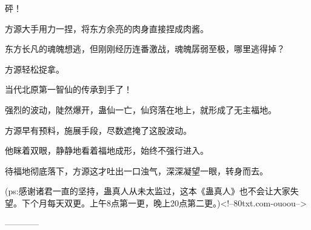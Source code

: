 \begin{this_body}
砰！

方源大手用力一捏，将东方余亮的肉身直接捏成肉酱。

东方长凡的魂魄想逃，但刚刚经历连番激战，魂魄孱弱至极，哪里逃得掉？

方源轻松捉拿。

当代北原第一智仙的传承到手了！

强烈的波动，陡然爆开，蛊仙一亡，仙窍落在地上，就形成了无主福地。

方源早有预料，施展手段，尽数遮掩了这股波动。

他眯着双眼，静静地看着福地成形，始终不强行进入。

待福地彻底落下，方源这才吐出一口浊气，深深凝望一眼，转身而去。

(ps:感谢诸君一直的坚持，蛊真人从未太监过，这本《蛊真人》也不会让大家失望。下个月每天双更。上午8点第一更，晚上20点第二更。)<!--80txt.com-ouoou-->

------------

\end{this_body}

